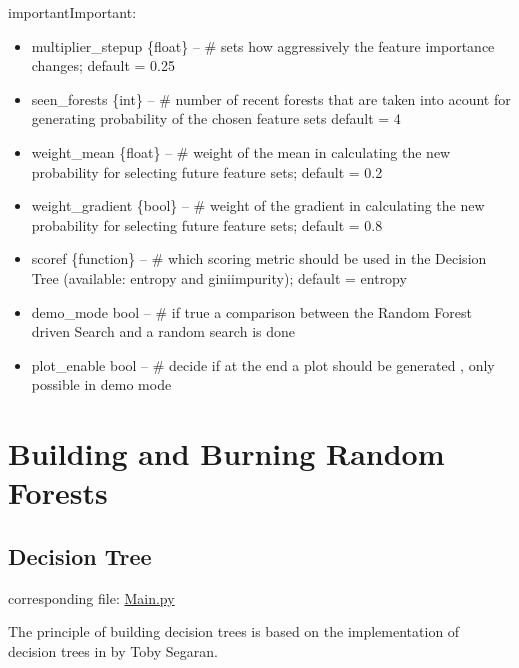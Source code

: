 \documentclass[letterpaper,10pt,english]{sphinxmanual}
\begin{document}
\begin{sphinxadmonition}{important}{Important:}
\begin{fulllineitems}
\begin{itemize}
\item {} 
multiplier\_stepup \{float\} -- \# sets how aggressively the feature importance changes; default = 0.25

\item {} 
seen\_forests \{int\} -- \# number of recent forests that are taken into acount for generating probability of the chosen feature sets default = 4

\item {} 
weight\_mean \{float\} -- \# weight of the mean in calculating the new probability for selecting future feature sets; default = 0.2

\item {} 
weight\_gradient \{bool\} -- \# weight of the gradient in calculating the new probability for selecting future feature sets; default = 0.8

\item {} 
scoref \{function\} -- \# which scoring metric should be used in the Decision Tree (available: entropy and giniimpurity); default = entropy

\item {} 
demo\_mode bool -- \# if true a comparison between the Random Forest driven Search and a random search is done

\item {} 
plot\_enable bool -- \# decide if at the end a plot should be generated , only possible in demo mode

\end{itemize}

\end{fulllineitems}

\end{sphinxadmonition}


\chapter{Building and Burning Random Forests}
\label{\detokenize{index:building-and-burning-random-forests}}\label{\detokenize{index:loop}}

\section{Decision Tree}
\label{\detokenize{DT::doc}}\label{\detokenize{DT:decision-tree}}\label{\detokenize{DT:singletree}}
corresponding file: \href{https://github.com/weinertmos/ForestFire/blob/master/source/ForestFire/Main.py}{Main.py}

The principle of building decision trees is based on the implementation of decision trees in \label{\detokenize{DT:id1}}{\hyperref[\detokenize{Overview:collective-intelligence}]{}} by Toby Segaran.
\end{document}
